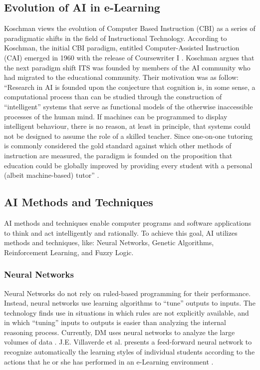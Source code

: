 \documentclass[12pt,a4paper,final,twoside,onecolumn,titlepage]{book}
\begin{document}
\subsection{Evolution of AI in e-Learning}
Koschman views the evolution of Computer Based Instruction (CBI) as a series of paradigmatic shifts in the field of Instructional Technology. According to Koschman, the initial CBI paradigm, entitled Computer-Assisted Instruction (CAI) emerged in 1960 with the release of Coursewriter I \cite{R29}. Koschman argues that the next paradigm shift \gls{ITS} was founded by members of the AI community who had migrated to the educational community. Their motivation was as follow:
“Research in AI is founded upon the conjecture that cognition is, in some sense, a computational process than can be studied through the construction of “intelligent” systems that serve as functional models of the otherwise inaccessible processes of the human mind. If machines can be programmed to display intelligent behaviour, there is no reason, at least in principle, that systems could not be designed to assume the role of a skilled teacher. Since one-on-one tutoring is commonly considered the gold standard against which other methods of instruction are measured, the paradigm is founded on the proposition that education could be globally improved by providing every student with a personal (albeit machine-based) tutor” \cite{R29}.

\subsection{AI Methods and Techniques}
AI methods and techniques enable computer programs and software applications to think and act intelligently and rationally. To achieve this goal, AI utilizes methods and techniques, like: Neural Networks, Genetic Algorithms, Reinforcement Learning, and Fuzzy Logic.

\subsubsection{Neural Networks}
Neural Networks do not rely on ruled-based programming for their performance. Instead, neural networks use learning algorithms to “tune” outputs to inputs. The technology finds use in situations in which rules are not explicitly available, and in which “tuning” inputs to outputs is easier than analyzing the internal reasoning process. Currently, \gls{DM} uses neural networks to analyze the large volumes of data \cite{R30}. J.E. Villaverde et al. presents a feed-forward neural network to recognize automatically the learning styles of individual students according to the actions that he or she has performed in an e-Learning environment \cite{R31}.
\end{document}
